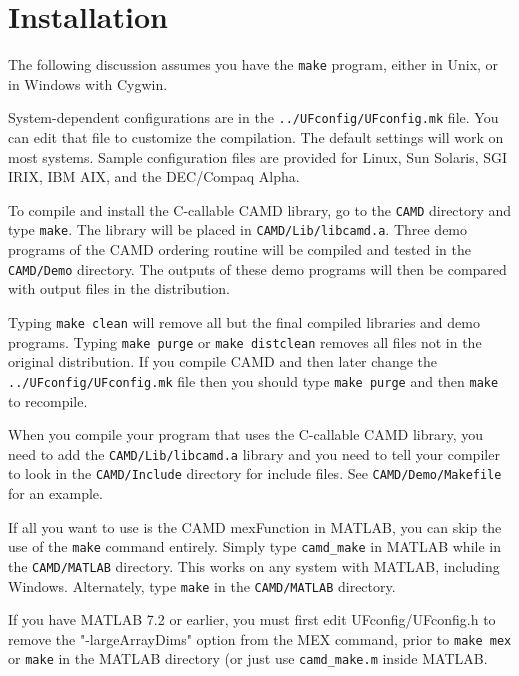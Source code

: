 \documentclass[11pt]{article}
\begin{document}
\section{Installation}
\label{Install}

The following discussion assumes you have the {\tt make} program, either in
Unix, or in Windows with Cygwin.

System-dependent configurations are in the {\tt ../UFconfig/UFconfig.mk}
file.  You can edit that file to customize the compilation.  The default
settings will work on most systems.
Sample configuration files are provided
for Linux, Sun Solaris, SGI IRIX, IBM AIX, and the DEC/Compaq Alpha.

To compile and install the C-callable CAMD library,
go to the {\tt CAMD} directory and type {\tt make}.
The library will be placed in {\tt CAMD/Lib/libcamd.a}.
Three demo programs of the CAMD ordering routine will be compiled and tested in
the {\tt CAMD/Demo} directory.
The outputs of these demo programs will then be compared with output
files in the distribution.

Typing {\tt make clean} will remove all but the final compiled libraries
and demo programs.  Typing {\tt make purge} or {\tt make distclean}
removes all files not in the original distribution.
If you compile CAMD and then later change the {\tt ../UFconfig/UFconfig.mk} file
then you should type {\tt make purge} and then {\tt make} to recompile.

When you compile your program that uses the C-callable CAMD library,
you need to add the {\tt CAMD/Lib/libcamd.a} library
and you need to tell your compiler to look in the
{\tt CAMD/Include} directory for include
files.
See {\tt CAMD/Demo/Makefile} for an example.

If all you want to use is the CAMD mexFunction in MATLAB, you can skip
the use of the {\tt make} command entirely.  Simply type
{\tt camd\_make} in MATLAB while in the {\tt CAMD/MATLAB} directory.
This works on any system with MATLAB, including Windows.
Alternately, type {\tt make} in the {\tt CAMD/MATLAB} directory.

If you have MATLAB 7.2 or earlier, you must first edit UFconfig/UFconfig.h to
remove the "-largeArrayDims" option from the MEX command, prior to
{\tt make mex} or {\tt make} in the MATLAB directory
(or just use {\tt camd\_make.m} inside MATLAB.
\end{document}
